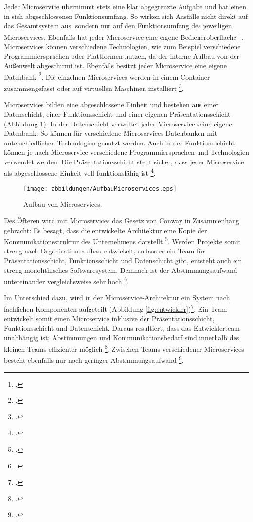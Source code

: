 Jeder Microservice übernimmt stets eine klar abgegrenzte Aufgabe und hat einen in sich abgeschlossenen Funktionsumfang. So wirken sich Ausfälle nicht direkt auf das Gesamtsystem aus, sondern nur auf den Funktionsumfang des jeweiligen Microservices. Ebenfalls hat jeder Microservice eine eigene Bedieneroberfläche \footcite[Vgl.][S.79]{albrecht2020}. Microservices können verschiedene Technologien, wie zum Beispiel verschiedene Programmiersprachen oder Plattformen nutzen, da der interne Aufbau von der Außenwelt abgeschirmt ist. Ebenfalls besitzt jeder Microservice eine eigene Datenbank \footcite[Vgl.][S.2]{wolff2018}. Die einzelnen Microservices werden in einem Container zusammengefasst oder auf virtuellen Maschinen installiert \footcite[Vgl.][S.79]{albrecht2020}.

Microservices bilden eine abgeschlossene Einheit und bestehen aus einer Datenschicht, einer Funktionsschicht und einer eigenen Präsentationsschicht (Abbildung \ref{fig:mcsaufbau}): In der Datenschicht verwaltet jeder Microservice seine eigene Datenbank. So können für verschiedene Microservices Datenbanken mit unterschiedlichen Technologien genutzt werden. Auch in der Funktionsschicht können je nach Microservice verschiedene Programmiersprachen und Technologien verwendet werden. Die Präsentationsschicht stellt sicher, dass jeder Microservice als abgeschlossene Einheit voll funktionsfähig ist \footcite[Vgl.][S.81 f.]{albrecht2020}.

\begin{figure}[ht!]
\centering
\caption{Aufbau von Microservices.}
\texttt{[image: abbildungen/AufbauMicroservices.eps]}
\cite[Quelle: In Anlehnung an][S.81 f.]{albrecht2020}
\label{fig:mcsaufbau}
\end{figure}

Des Öfteren wird mit Microservices das Gesetz von Conway in Zusammenhang gebracht: Es besagt, dass die entwickelte Architektur eine Kopie der Kommunikationsstruktur des Unternehmens darstellt \footcite[Vgl.][S.2]{fowler2015}. Werden Projekte somit streng nach Organisationsaufbau entwickelt, sodass es ein Team für Präsentationsschicht, Funktionsschicht und Datenschicht gibt, entsteht auch ein streng monolithisches Softwaresystem. Demnach ist der Abstimmungsaufwand untereinander vergleichsweise sehr hoch \footcite[Vgl.][S.81]{albrecht2020}. 

Im Unterschied dazu, wird in der Microservice-Architektur ein System nach fachlichen Komponenten aufgeteilt (Abbildung \ref{fig:entwickler})\footcite[Vgl.][S.81 f.]{albrecht2020}. Ein Team entwickelt somit einen Microservice inklusive der Präsentationsschicht, Funktionsschicht und Datenschicht. Daraus resultiert, dass das Entwicklerteam unabhängig ist; Abstimmungen und Kommunikationsbedarf sind innerhalb des kleinen Teams effizienter möglich \footcite[Vgl.][S.41]{wolff2018}. Zwischen Teams verschiedener Microservices besteht ebenfalls nur noch geringer Abstimmungsaufwand \footcite[Vgl.][S.81]{albrecht2020}.

